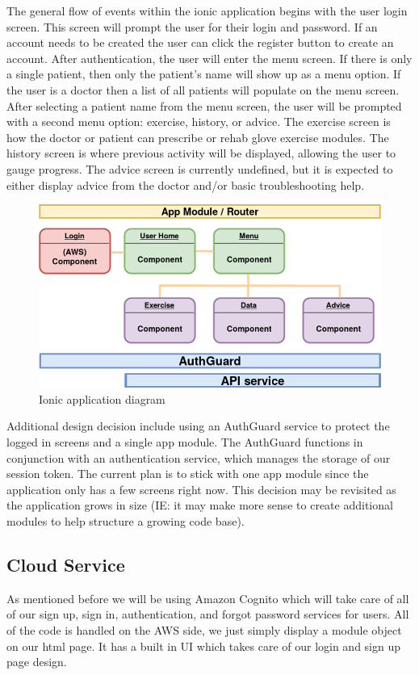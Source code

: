 \documentclass[a4paper,10pt]{article}
\begin{document}
            The general flow of events within the ionic application begins with the user login screen. This screen will prompt the user for their login and password. If an account needs to be created the user can click the register button to create an account. After authentication, the user will enter the menu screen. If there is only a single patient, then only the patient's name will show up as a menu option. If the user is a doctor then a list of all patients will populate on the menu screen. After selecting a patient name from the menu screen, the user will be prompted with a second menu option: exercise, history, or advice. The exercise screen is how the doctor or patient can prescribe or rehab glove exercise modules. The history screen is where previous activity will be displayed, allowing the user to gauge progress. The advice screen is currently undefined, but it is expected to either display advice from the doctor and/or basic troubleshooting help.
            \begin{figure}[h]
            \centering
            \includegraphics[width=140mm, scale=1]{ionicAppLayout}
            \caption{Ionic application diagram}
            \end{figure}
            
            Additional design decision include using an AuthGuard service to protect the logged in screens and a single app module. The AuthGuard functions in conjunction with an authentication service, which manages the storage of our session token. The current plan is to stick with one app module since the application only has a few screens right now. This decision may be revisited as the application grows in size (IE: it may make more sense to create additional modules to help structure a growing code base). 
            
        \subsection{Cloud Service}
	As mentioned before we will be using Amazon Cognito which will take care of all of our sign up, sign in, authentication, and forgot password services for users. All of the code is handled on the AWS side, we just simply display a module object on our html page. It has a built in UI which takes care of our login and sign up page design.
\end{document}
